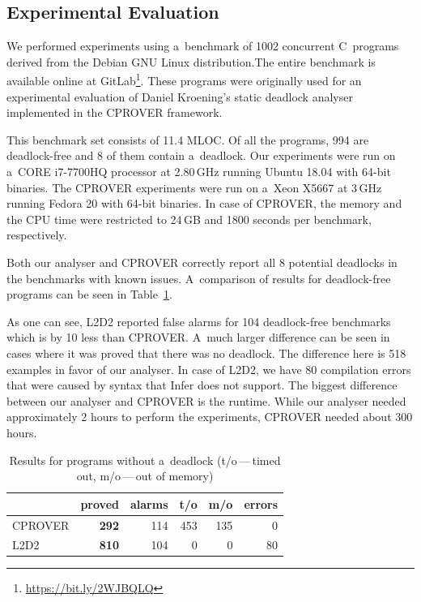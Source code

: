 \documentclass{ExcelAtFIT}
\begin{document}
\subsection{Experimental Evaluation}
We performed experiments using a~benchmark of 1002 concurrent C~programs derived from the Debian GNU Linux distribution.The entire benchmark is available online at GitLab\footnote{\url{https://bit.ly/2WJBQLQ}}. These programs were originally used for an experimental evaluation of Daniel Kroening's static deadlock analyser~\cite{cprover} implemented in the CPROVER framework.

This benchmark set consists of 11.4 MLOC. Of all the programs, 994 are deadlock-free and 8 of them contain a~deadlock. Our experiments were run on a~CORE i7-7700HQ processor at 2.80\,GHz running Ubuntu 18.04 with 64-bit binaries. The CPROVER experiments were run on a~Xeon X5667 at 3\,GHz running Fedora 20 with 64-bit binaries. In case of CPROVER, the memory and the CPU time were restricted to 24\,GB and 1800 seconds per benchmark, respectively.

Both our analyser and CPROVER correctly report all 8 potential deadlocks in the benchmarks with known issues. A~comparison of results for deadlock-free programs can be seen in Table~\ref{tbl:DeadlockBanch}.

As one can see, L2D2 reported false alarms for 104 deadlock-free benchmarks which is by 10 less than CPROVER. A~much larger difference can be seen in cases where it was proved that there was no deadlock. The difference here is 518 examples in favor of our analyser. In case of L2D2, we have 80 compilation errors that were caused by syntax that Infer does not support. The biggest difference between our analyser and CPROVER is the runtime. While our analyser needed approximately 2 hours to perform the experiments, CPROVER needed about 300 hours.
\begin{table}[t]
\caption{Results for programs without a~deadlock (t/o\,---\,timed out, m/o\,---\,out of memory)}
\begin{tabular}{l|r|r|r|r|r}
        & \multicolumn{1}{l|}{\textbf{proved}} & \multicolumn{1}{l|}{alarms} & \multicolumn{1}{l|}{t/o} & \multicolumn{1}{l|}{m/o} & \multicolumn{1}{l}{errors} \\ \hline
CPROVER & \textbf{292}                        & 114                        & 453                     & 135                     & 0                          \\
L2D2    & \textbf{810}                        & 104                        & 0                       & 0                       & 80
\end{tabular}
\label{tbl:DeadlockBanch}
\vspace{-5mm}
\end{table}
\end{document}
